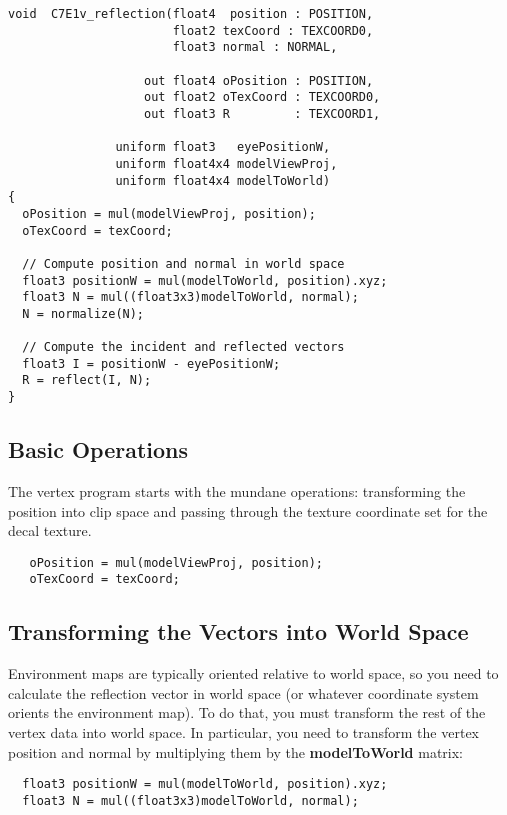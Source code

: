 \documentclass[../main.tex]{subfiles}
\begin{document}
\FloatBarrier
\begin{lstlisting}[caption=Example 7-1. The \textbf{C7E1v_reflection} Vertex Program]
void  C7E1v_reflection(float4  position : POSITION,
                       float2 texCoord : TEXCOORD0,
                       float3 normal : NORMAL,

                   out float4 oPosition : POSITION,
                   out float2 oTexCoord : TEXCOORD0,
                   out float3 R         : TEXCOORD1,

               uniform float3   eyePositionW,
               uniform float4x4 modelViewProj,
               uniform float4x4 modelToWorld)
{
  oPosition = mul(modelViewProj, position);
  oTexCoord = texCoord;

  // Compute position and normal in world space
  float3 positionW = mul(modelToWorld, position).xyz;
  float3 N = mul((float3x3)modelToWorld, normal);
  N = normalize(N);

  // Compute the incident and reflected vectors
  float3 I = positionW - eyePositionW;
  R = reflect(I, N);
}
\end{lstlisting}
\FloatBarrier

\subsection*{Basic Operations}

The vertex program starts with the mundane operations: transforming the position into clip space and passing through the texture coordinate set for the decal texture.

\FloatBarrier
\begin{lstlisting}
   oPosition = mul(modelViewProj, position);
   oTexCoord = texCoord;
\end{lstlisting}
\FloatBarrier

\subsection*{Transforming the Vectors into World Space}

Environment maps are typically oriented relative to world space, so you need to calculate the reflection vector in world space (or whatever coordinate system orients the environment map). To do that, you must transform the rest of the vertex data into world space. In particular, you need to transform the vertex position and normal by multiplying them by the \textbf{modelToWorld} matrix:

\FloatBarrier
\begin{lstlisting}
  float3 positionW = mul(modelToWorld, position).xyz;
  float3 N = mul((float3x3)modelToWorld, normal);
\end{lstlisting}
\FloatBarrier
  
\end{document}
